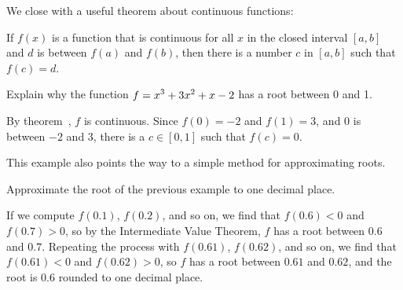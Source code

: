 We close with a useful theorem about continuous functions:

\begin{mainTheorem}
If $f(x)$ is a function that is continuous for all $x$ in the closed
interval $[a,b]$ and $d$ is between $f(a)$ and $f(b)$, then there is a
number $c$ in $[a, b]$ such that $f(c) = d$.
\end{mainTheorem}




\begin{example} Explain why the function $\displaystyle f=x^3 + 3x^2+x-2$ has a root between 0
and 1.

By theorem~, $f$ is continuous.
Since $f(0)=-2$ and $f(1)=3$, and $0$ is between $-2$ and $3$, there
is a $c\in[0,1]$ such that $f(c)=0$.
\end{example}

This example also points the way to a simple method for approximating
roots. 

\begin{example} Approximate the root of the previous example  to one decimal
place.

If we compute $f(0.1)$, $f(0.2)$, and so on, we find that 
$f(0.6)<0$ and $f(0.7)>0$, so by the Intermediate Value Theorem, $f$
has a root between $0.6$ and $0.7$. Repeating the process with
$f(0.61)$, $f(0.62)$, and so on, we find that
$f(0.61)<0$ and $f(0.62)>0$, so $f$ has a root between
$0.61$ and $0.62$, and the root is $0.6$ rounded to one decimal place.
\end{example}


